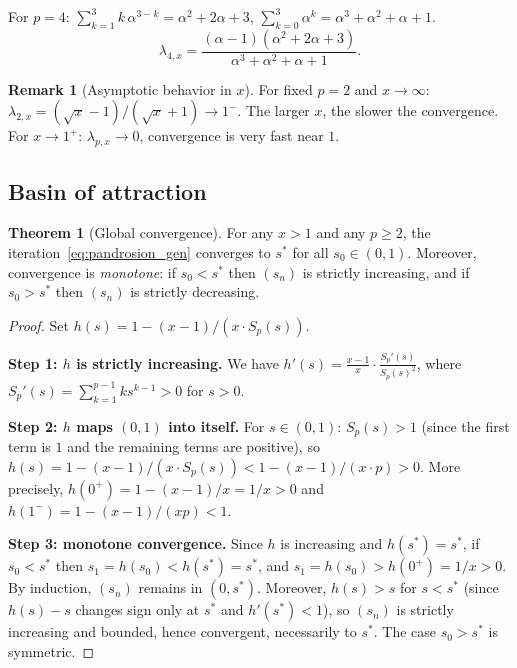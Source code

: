 \documentclass[11pt,a4paper]{article}
\theoremstyle{definition}
\newtheorem{theorem}{Theorem}[section]
\newtheorem{remark}{Remark}[section]
\begin{document}
For $p = 4$: $\sum_{k=1}^{3}k\,\alpha^{3-k} = \alpha^2 + 2\alpha + 3$, $\sum_{k=0}^{3}\alpha^k = \alpha^3+\alpha^2+\alpha+1$.
\begin{equation}
  \label{eq:lambda4}
  \lambda_{4,x} = \frac{(\alpha-1)(\alpha^2+2\alpha+3)}{\alpha^3+\alpha^2+\alpha+1}.
\end{equation}

\begin{remark}[Asymptotic behavior in $x$]
For fixed $p = 2$ and $x \to \infty$: $\lambda_{2,x} = (\sqrt{x}-1)/(\sqrt{x}+1) \to 1^-$. The larger $x$, the slower the convergence. For $x \to 1^+$: $\lambda_{p,x} \to 0$, convergence is very fast near $1$.
\end{remark}

\subsection{Basin of attraction}

\begin{theorem}[Global convergence]
\label{thm:bassin}
For any $x > 1$ and any $p \geq 2$, the iteration~\eqref{eq:pandrosion_gen} converges to $s^*$ for all $s_0 \in (0,1)$. Moreover, convergence is \emph{monotone}: if $s_0 < s^*$ then $(s_n)$ is strictly increasing, and if $s_0 > s^*$ then $(s_n)$ is strictly decreasing.
\end{theorem}

\begin{proof}
Set $h(s) = 1 - (x-1)/(x \cdot S_p(s))$.

\textbf{Step 1: $h$ is strictly increasing.}
We have $h'(s) = \frac{x-1}{x} \cdot \frac{S_p'(s)}{S_p(s)^2}$, where $S_p'(s) = \sum_{k=1}^{p-1} k s^{k-1} > 0$ for $s > 0$.

\textbf{Step 2: $h$ maps $(0,1)$ into itself.}
For $s \in (0,1)$: $S_p(s) > 1$ (since the first term is $1$ and the remaining terms are positive), so $h(s) = 1 - (x-1)/(x \cdot S_p(s)) < 1 - (x-1)/(x \cdot p) > 0$. More precisely, $h(0^+) = 1 - (x-1)/x = 1/x > 0$ and $h(1^-) = 1 - (x-1)/(xp) < 1$.

\textbf{Step 3: monotone convergence.}
Since $h$ is increasing and $h(s^*) = s^*$, if $s_0 < s^*$ then $s_1 = h(s_0) < h(s^*) = s^*$, and $s_1 = h(s_0) > h(0^+) = 1/x > 0$. By induction, $(s_n)$ remains in $(0, s^*)$. Moreover, $h(s) > s$ for $s < s^*$ (since $h(s) - s$ changes sign only at $s^*$ and $h'(s^*) < 1$), so $(s_n)$ is strictly increasing and bounded, hence convergent, necessarily to $s^*$. The case $s_0 > s^*$ is symmetric.
\end{proof}
\end{document}
